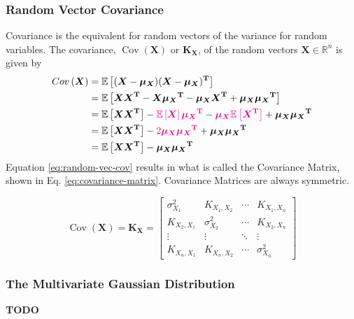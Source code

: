\documentclass[12pt]{article}
\newcommand{\mat}[1]{\mathbf{#1}}
\newcommand{\brac}[1]{\left[#1\right]} %
\newcommand{\parentheses}[1]{\left(#1\right)}
\newcommand{\R}{\mathbb{R}}
\newcommand{\cov}[1]{\mathop{Cov}\parentheses{#1}}
\newcommand{\mb}[1]{{\boldsymbol{#1}}} %
\newcommand{\expv}[1]{\mathbb{E}\brac{#1}} %
\newcommand{\magenta}[1]{\color{magenta}#1\color{black}}
\begin{document}
\subsubsection{Random Vector Covariance}
Covariance is the equivalent for random vectors of the variance for random variables. The covariance, $\cov{\mb{X}}$ or $\mat{K}_{\mb{X}}$, of the random vectors $\mb{X} \in \R^n$ is given by
\begin{equation}
    \begin{aligned}
        \cov{\mb{X}} &= \expv{(\mb{X} - \mb{\mu_X}) (\mb{X} - \mb{\mu_X})^\mathbf{T}} \\
        &= \expv{\mb{X}\mb{X}^\mathbf{T} - \mb{X}\mb{\mu_X}^\mathbf{T} - \mb{\mu_X}\mb{X}^{\mathbf{T}} + \mb{\mu_X} \mb{\mu_X}^\mathbf{T}} \\
        &= \expv{\mb{X}\mb{X}^\mathbf{T}} - \magenta{\expv{\mb{X}}\mb{\mu_X}^\mathbf{T}} - \magenta{\mb{\mu_X}\expv{\mb{X}^{\mathbf{T}}}} + \mb{\mu_X} \mb{\mu_X}^\mathbf{T}\\
        &= \expv{\mb{X}\mb{X}^\mathbf{T}} - \magenta{2 \mb{\mu_X} \mb{\mu_X}^\mathbf{T}} + \mb{\mu_X} \mb{\mu_X}^\mathbf{T}\\
        &= \expv{\mb{X}\mb{X}^\mathbf{T}} - \mb{\mu_X} \mb{\mu_X}^\mathbf{T}
    \end{aligned}
    \label{eq:random-vec-cov}
\end{equation}
Equation \ref{eq:random-vec-cov} results in what is called the Covariance Matrix, shown in Eq. \ref{eq:covariance-matrix}. Covariance Matrices are always symmetric.

\begin{equation}
    \cov{\mb{X}} = \mat{K}_{\mb{X}} = \begin{bmatrix}
        \sigma^2_{X_1} & K_{X_1, X_2} & \cdots & K_{X_1, X_n} \\
        K_{X_2, X_1} & \sigma^2_{X_2} & \cdots & K_{X_2, X_n} \\
        \vdots & \vdots & \ddots & \vdots \\
        K_{X_n, X_1} & K_{X_n, X_2} & \cdots & \sigma_{X_n}^2
    \end{bmatrix}
    \label{eq:covariance-matrix}
\end{equation}

\subsubsection{The Multivariate Gaussian Distribution}
\magenta{\textbf{TODO}}
\end{document}
